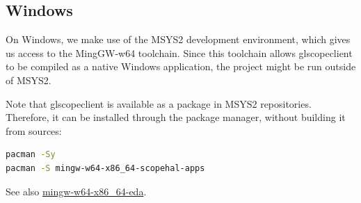 \subsection{Windows}

On Windows, we make use of the MSYS2 development environment, which gives us access to the MingGW-w64 toolchain.
Since this toolchain allows glscopeclient to be compiled as a native Windows application, the project might be run
outside of MSYS2.

Note that glscopeclient is available as a package in MSYS2 repositories.
Therefore, it can be installed through the package manager, without building it from sources:

\begin{lstlisting}[language=sh]
pacman -Sy
pacman -S mingw-w64-x86_64-scopehal-apps
\end{lstlisting}

See also \href{https://packages.msys2.org/group/mingw-w64-x86_64-eda}{mingw-w64-x86_64-eda}.

